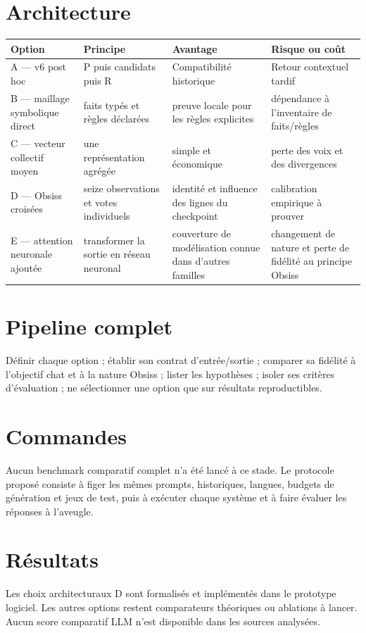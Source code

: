 \documentclass[11pt,a4paper]{report}
\begin{document}
\section{Architecture}
{\small\begin{longtable}{p{}p{}p{}p{}}
\toprule
Option & Principe & Avantage & Risque ou coût \\
\midrule
A — v6 post hoc & P puis candidats puis R & Compatibilité historique & Retour contextuel tardif \\
B — maillage symbolique direct & faits typés et règles déclarées & preuve locale pour les règles explicites & dépendance à l'inventaire de faits/règles \\
C — vecteur collectif moyen & une représentation agrégée & simple et économique & perte des voix et des divergences \\
D — Obsiss croisées & seize observations et votes individuels & identité et influence des lignes du checkpoint & calibration empirique à prouver \\
E — attention neuronale ajoutée & transformer la sortie en réseau neuronal & couverture de modélisation connue dans d'autres familles & changement de nature et perte de fidélité au principe Obsiss \\
\bottomrule
\end{longtable}}
\section{Pipeline complet}
Définir chaque option ; établir son contrat d'entrée/sortie ; comparer sa fidélité à l'objectif chat et à la nature Obsiss ; lister les hypothèses ; isoler ses critères d'évaluation ; ne sélectionner une option que sur résultats reproductibles.
\section{Commandes}
Aucun benchmark comparatif complet n'a été lancé à ce stade. Le protocole proposé consiste à figer les mêmes prompts, historiques, langues, budgets de génération et jeux de test, puis à exécuter chaque système et à faire évaluer les réponses à l'aveugle.
\section{Résultats}
Les choix architecturaux D sont formalisés et implémentés dans le prototype logiciel. Les autres options restent comparateurs théoriques ou ablations à lancer. Aucun score comparatif LLM n'est disponible dans les sources analysées.
\end{document}
